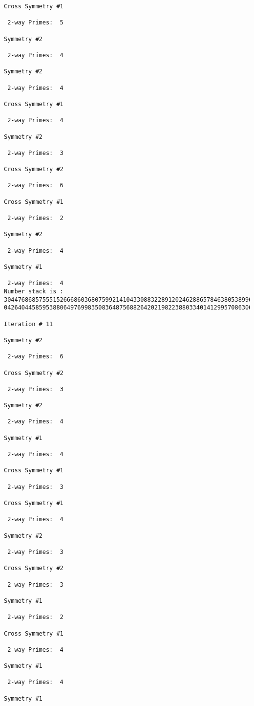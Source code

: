 \begin{verbatim}
Cross Symmetry #1

 2-way Primes: 	5

Symmetry #2

 2-way Primes: 	4

Symmetry #2

 2-way Primes: 	4

Cross Symmetry #1

 2-way Primes: 	4

Symmetry #2

 2-way Primes: 	3

Cross Symmetry #2

 2-way Primes: 	6

Cross Symmetry #1

 2-way Primes: 	2

Symmetry #2

 2-way Primes: 	4

Symmetry #1

 2-way Primes: 	4
Number stack is :
30447686857555152666860368075992141043308832289120246288657846380538996794608835958544046240163340857
04264044585953880649769983508364875688264202198223880334014129957086306866625155575868674403758043361

Iteration #	11

Symmetry #2

 2-way Primes: 	6

Cross Symmetry #2

 2-way Primes: 	3

Symmetry #2

 2-way Primes: 	4

Symmetry #1

 2-way Primes: 	4

Cross Symmetry #1

 2-way Primes: 	3

Cross Symmetry #1

 2-way Primes: 	4

Symmetry #2

 2-way Primes: 	3

Cross Symmetry #2

 2-way Primes: 	3

Symmetry #1

 2-way Primes: 	2

Cross Symmetry #1

 2-way Primes: 	4

Symmetry #1

 2-way Primes: 	4

Symmetry #1


\end{verbatim}
